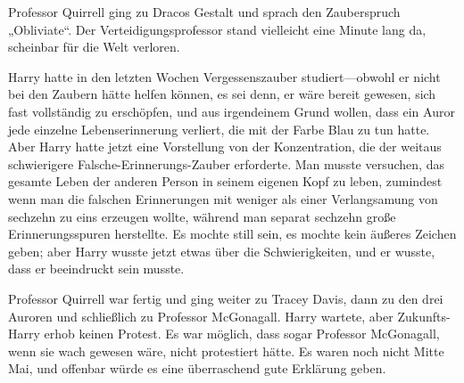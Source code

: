 Professor Quirrell ging zu Dracos Gestalt und sprach den Zauberspruch „Obliviate“. Der Verteidigungsprofessor stand vielleicht eine Minute lang da, scheinbar für die Welt verloren.

Harry hatte in den letzten Wochen Vergessenszauber studiert—obwohl er nicht bei den Zaubern hätte helfen können, es sei denn, er wäre bereit gewesen, sich fast vollständig zu erschöpfen, und aus irgendeinem Grund wollen, dass ein Auror jede einzelne Lebenserinnerung verliert, die mit der Farbe Blau zu tun hatte. Aber Harry hatte jetzt eine Vorstellung von der Konzentration, die der weitaus schwierigere Falsche-Erinnerungs-Zauber erforderte. Man musste versuchen, das gesamte Leben der anderen Person in seinem eigenen Kopf zu leben, zumindest wenn man die falschen Erinnerungen mit weniger als einer Verlangsamung von sechzehn zu eins erzeugen wollte, während man separat sechzehn große Erinnerungsspuren herstellte. Es mochte still sein, es mochte kein äußeres Zeichen geben; aber Harry wusste jetzt etwas über die Schwierigkeiten, und er wusste, dass er beeindruckt sein musste.

Professor Quirrell war fertig und ging weiter zu Tracey Davis, dann zu den drei Auroren und schließlich zu Professor McGonagall. Harry wartete, aber Zukunfts-Harry erhob keinen Protest. Es war möglich, dass sogar Professor McGonagall, wenn sie wach gewesen wäre, nicht protestiert hätte. Es waren noch nicht Mitte Mai, und offenbar würde es eine überraschend gute Erklärung geben.

